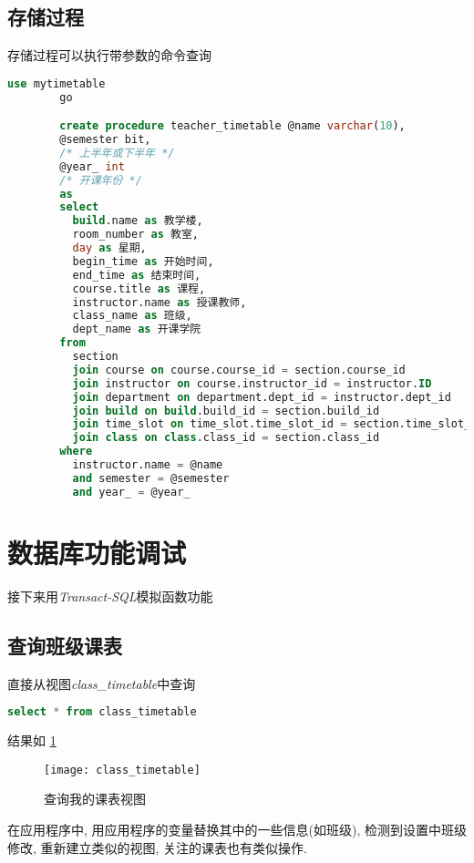 \documentclass{myreport}
\begin{document}
    \subsection{存储过程}
      存储过程可以执行带参数的命令查询
      \begin{lstlisting}[language=sql]
        use mytimetable
        go

        create procedure teacher_timetable @name varchar(10),
        @semester bit,
        /* 上半年或下半年 */
        @year_ int
        /* 开课年份 */
        as
        select
          build.name as 教学楼,
          room_number as 教室,
          day as 星期,
          begin_time as 开始时间,
          end_time as 结束时间,
          course.title as 课程,
          instructor.name as 授课教师,
          class_name as 班级,
          dept_name as 开课学院
        from
          section
          join course on course.course_id = section.course_id
          join instructor on course.instructor_id = instructor.ID
          join department on department.dept_id = instructor.dept_id
          join build on build.build_id = section.build_id
          join time_slot on time_slot.time_slot_id = section.time_slot_id
          join class on class.class_id = section.class_id
        where
          instructor.name = @name
          and semester = @semester
          and year_ = @year_

      \end{lstlisting}
\section{数据库功能调试}
    接下来用\emph{Transact-SQL}模拟函数功能
  \subsection{查询班级课表}
    直接从视图\emph{class\_timetable}中查询
    \begin{lstlisting}[language=sql]
        select * from class_timetable
    \end{lstlisting}

      结果如
      \cref{fig:class_timetable}
      \begin{figure}[H]
        \centering
        \texttt{[image: class\_timetable]}
        \caption{查询我的课表视图}
        \label{fig:class_timetable}
      \end{figure}

    在应用程序中, 用应用程序的变量替换其中的一些信息(如班级),
    检测到设置中班级修改, 重新建立类似的视图, 关注的课表也有类似操作.
\end{document}
